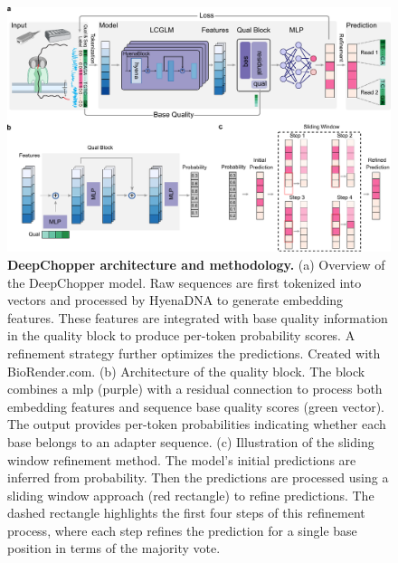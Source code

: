 \documentclass[pdflatex,sn-nature, lineno]{sn-jnl}%
\begin{document}
\begin{figure}[!ht]
	\includegraphics[height=0.63\columnwidth]{finals/figure1}
	\caption{{\bf DeepChopper architecture and methodology.} (a) Overview of the DeepChopper model. Raw sequences are first tokenized into vectors and processed by HyenaDNA to generate embedding features. These features are integrated with base quality information in the quality block to produce per-token probability scores. A refinement strategy further optimizes the predictions. Created with BioRender.com. (b) Architecture of the quality block. The block combines a \gls{mlp} (purple) with a residual connection to process both embedding features and sequence base quality scores (green vector). The output provides per-token probabilities indicating whether each base belongs to an adapter sequence. (c) Illustration of the sliding window refinement method. The model's initial predictions are inferred from probability. Then the predictions are processed using a sliding window approach (red rectangle) to refine predictions. The dashed rectangle highlights the first four steps of this refinement process, where each step refines the prediction for a single base position in terms of the majority vote.}\label{fig:f1}
\end{figure}
\end{document}
